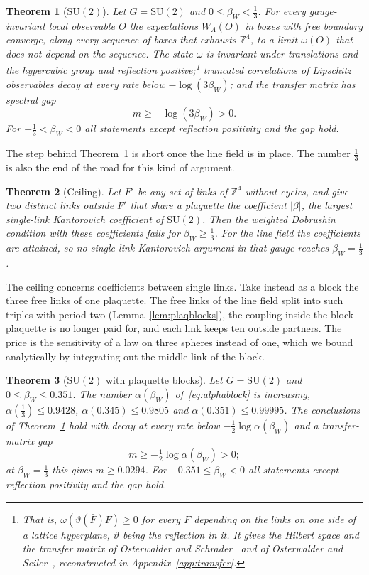 \documentclass[11pt]{amsart}
\newtheorem{theorem}{Theorem}[section]
\theoremstyle{definition}
\theoremstyle{remark}
\numberwithin{equation}{section}
\newcommand{\Z}{\mathbb{Z}}
\newcommand{\SU}{\mathrm{SU}}
\begin{document}
\begin{theorem}[$\SU(2)$]\label{thm:su2}
Let $G=\SU(2)$ and $0\le\beta_W<\frac13$. For every gauge-invariant local
observable $O$ the expectations $W_\Lambda(O)$ in boxes with free boundary
converge, along every sequence of boxes that exhausts $\Z^4$, to a limit
$\omega(O)$ that does not depend on the sequence. The state $\omega$ is
invariant under translations and the hypercubic group and reflection
positive;\footnote{That is, $\omega(\vartheta(\bar F)F)\ge0$ for every $F$ depending on the links on one side of a lattice hyperplane, $\vartheta$ being the reflection in it. It gives the Hilbert space and the transfer matrix of Osterwalder and Schrader~\cite{OS73,OS75} and of Osterwalder and Seiler~\cite{OSei78}, reconstructed in Appendix~\ref{app:transfer}.} truncated correlations of Lipschitz observables decay at every
rate below $-\log(3\beta_W)$; and the transfer matrix has spectral gap
\[
m\ge-\log(3\beta_W)>0 .
\]
For $-\frac13<\beta_W<0$ all statements except reflection positivity and the
gap hold.
\end{theorem}

The step behind Theorem~\ref{thm:su2} is short once the line field is in
place. The number $\frac13$ is also
the end of the road for this kind of argument.

\begin{theorem}[Ceiling]\label{thm:ceiling}
Let $F'$ be any set of links of $\Z^4$ without cycles, and give two distinct
links outside $F'$ that share a plaquette the coefficient $|\beta|$, the
largest single-link Kantorovich coefficient of $\SU(2)$. Then the weighted
Dobrushin condition with these coefficients fails for $\beta_W\ge\frac13$.
For the line field the coefficients are attained, so no single-link
Kantorovich argument in that gauge reaches $\beta_W=\frac13$.
\end{theorem}

The ceiling concerns coefficients between single links. Take instead as a
block the three free links of one plaquette. The free links of the line
field split into such triples with period two (Lemma~\ref{lem:plaqblocks}),
the coupling inside the block plaquette is no longer paid for, and each link
keeps ten outside partners. The price is the sensitivity of a law on three
spheres instead of one, which we bound analytically by integrating out the
middle link of the block.

\begin{theorem}[$\SU(2)$ with plaquette blocks]\label{thm:blocks}
Let $G=\SU(2)$ and $0\le\beta_W\le0.351$. The number $\alpha(\beta_W)$
of~\eqref{eq:alphablock} is increasing, $\alpha(\frac13)\le0.9428$,
$\alpha(0.345)\le0.9805$ and $\alpha(0.351)\le0.99995$. The conclusions of Theorem~\ref{thm:su2} hold
with decay at every rate below $-\frac12\log\alpha(\beta_W)$ and a
transfer-matrix gap
\[
m\ge-\tfrac12\log\alpha(\beta_W)>0 ;
\]
at $\beta_W=\frac13$ this gives $m\ge0.0294$. For $-0.351\le\beta_W<0$ all
statements except reflection positivity and the gap hold.
\end{theorem}
\end{document}
